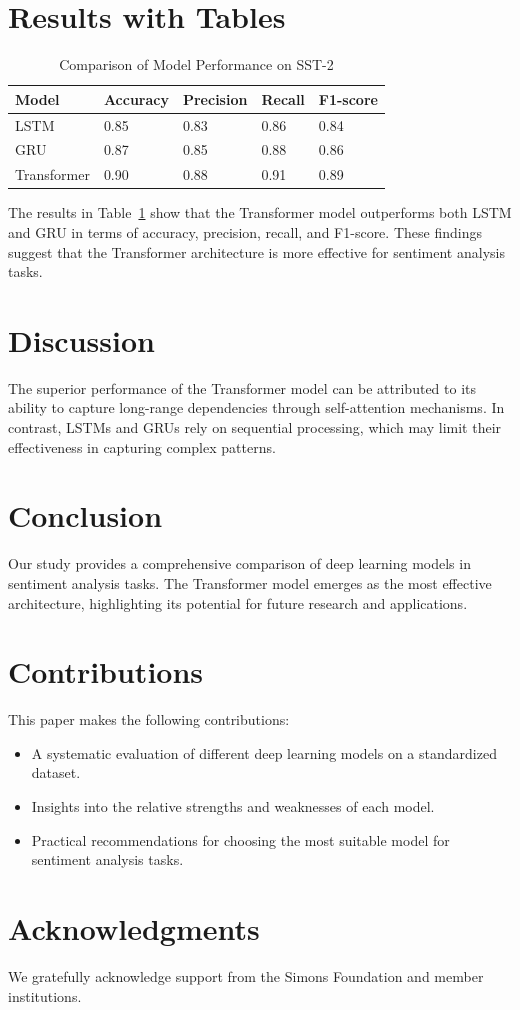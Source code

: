 \documentclass{article}
\begin{document}
\section{Results with Tables}
\begin{table}[htbp]
\centering
\caption{Comparison of Model Performance on SST-2}
\label{tab:performance}
\begin{tabular}{@{}lllll@{}}
\toprule
Model & Accuracy & Precision & Recall & F1-score \\ \midrule
LSTM & 0.85 & 0.83 & 0.86 & 0.84 \\
GRU & 0.87 & 0.85 & 0.88 & 0.86 \\
Transformer & 0.90 & 0.88 & 0.91 & 0.89 \\ \bottomrule
\end{tabular}
\end{table}

The results in Table~\ref{tab:performance} show that the Transformer model outperforms both LSTM and GRU in terms of accuracy, precision, recall, and F1-score. These findings suggest that the Transformer architecture is more effective for sentiment analysis tasks.

\section{Discussion}
The superior performance of the Transformer model can be attributed to its ability to capture long-range dependencies through self-attention mechanisms. In contrast, LSTMs and GRUs rely on sequential processing, which may limit their effectiveness in capturing complex patterns.

\section{Conclusion}
Our study provides a comprehensive comparison of deep learning models in sentiment analysis tasks. The Transformer model emerges as the most effective architecture, highlighting its potential for future research and applications.

\section{Contributions}
This paper makes the following contributions:
\begin{itemize}
    \item A systematic evaluation of different deep learning models on a standardized dataset.
    \item Insights into the relative strengths and weaknesses of each model.
    \item Practical recommendations for choosing the most suitable model for sentiment analysis tasks.
\end{itemize}

\section*{Acknowledgments}
We gratefully acknowledge support from the Simons Foundation and member institutions.



\end{document}
